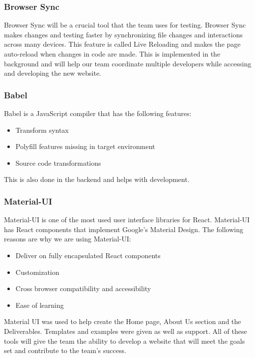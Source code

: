 \documentclass[journal,10pt,draftclsnofoot,onecolumn,compsoc]{IEEEtran} \usepackage[margin=0.75in]{geometry}
\begin{document}
\subsubsection{Browser Sync}
Browser Sync will be a crucial tool that the team uses for testing. Browser Sync makes changes and testing faster by synchronizing file changes and interactions across many devices. This feature is called Live Reloading and makes the page auto-reload when changes in code are made. This is implemented in the background and will help our team coordinate multiple developers while accessing and developing the new website.  
\subsubsection{Babel}
Babel is a JavaScript compiler that has the following features: 
\begin{itemize}
    \item Transform syntax
    \item Polyfill features missing in target environment
    \item Source code transformations
\end{itemize}
This is also done in the backend and helps with development. 

\subsubsection{Material-UI}
Material-UI is one of the most used user interface libraries for React. Material-UI has React components that implement Google's Material Design. The following reasons are why we are using Material-UI: 
\begin{itemize}
    \item Deliver on fully encapsulated React components
    \item Customization
    \item Cross browser compatibility and accessibility
    \item Ease of learning
\end{itemize}
Material UI was used to help create the Home page, About Us section and the Deliverables. Templates and examples were given as well as support. 
All of these tools will give the team the ability to develop a website that will meet the goals set and contribute to the team's success. 

\newpage
\end{document}
